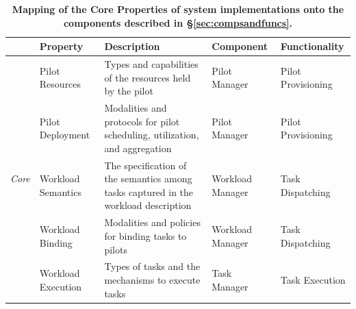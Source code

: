 \documentclass{sig-alternate}
\begin{document}
\begin{table}
\centering
\begin{tabular}{c|p{3.6cm}|p{5cm}|p{2.7cm}|p{2.7cm}|}
\cline{2-5}
                       &
\textbf{Property}      &
\textbf{Description}   &
\textbf{Component}     &
\textbf{Functionality} \\
\hline
\multirow{6}{*}{\textit{Core}}  &
Pilot Resources                 &
Types and capabilities of the resources held by the pilot &
Pilot Manager                   &
Pilot Provisioning              \\
\cline{2-5}
                                &
Pilot Deployment                &
Modalities and protocols for pilot scheduling, utilization, and aggregation &
Pilot Manager                   &
Pilot Provisioning \\
\cline{2-5}
                                &
Workload Semantics              &
The specification of the semantics among tasks captured in the workload
description &
Workload Manager                &
Task Dispatching \\
\cline{2-5}
                                &
Workload Binding                &
Modalities and policies for binding tasks to pilots &
Workload Manager                &
Task Dispatching \\
\cline{2-5}
                                &
Workload Execution              &
Types of tasks and the mechanisms to execute tasks &
Task Manager                    &
Task Execution \\
\hline
\end{tabular}
\caption{\textbf{Mapping of the Core Properties of \pilot system implementations
    onto the components described in \S\ref{sec:compsandfuncs}.}
}
\label{table:core_properties}
\end{table}
\end{document}
